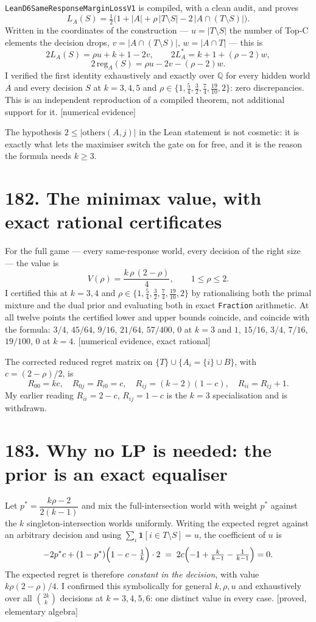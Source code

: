 \documentclass[9pt,twocolumn]{article}
\newcommand{\eclass}[1]{\textsf{[#1]}}
\renewcommand{\_}{\CIGunderscore\allowbreak}
\begin{document}
\texttt{LeanD6SameResponseMarginLossV1} is compiled, with a clean audit, and proves
\[ L_A(S)=\tfrac{1}{2}\bigl(1+|A|+\rho\,|T\setminus S|-2\,|A\cap(T\setminus S)|\bigr). \]
Written in the coordinates of the construction --- $u=|T\setminus S|$ the number of Top-C elements the decision drops, $v=|A\cap(T\setminus S)|$, $w=|A\cap T|$ --- this is
\[ 2L_A(S)=\rho u+k+1-2v,\qquad 2L^\ast_A=k+1+(\rho-2)w, \]
\[ 2\,\mathrm{reg}_A(S)=\rho u-2v-(\rho-2)w. \]
I verified the first identity exhaustively and exactly over $\mathbb{Q}$ for every hidden world $A$ and every decision $S$ at $k=3,4,5$ and $\rho\in\{1,\tfrac54,\tfrac32,\tfrac74,\tfrac{19}{10},2\}$: zero discrepancies. This is an independent reproduction of a compiled theorem, not additional support for it. \eclass{numerical evidence}

The hypothesis $2\le|\mathrm{others}(A,j)|$ in the Lean statement is not cosmetic: it is exactly what lets the maximiser switch the gate on for free, and it is the reason the formula needs $k\ge3$.

\section*{182. The minimax value, with exact rational certificates}

For the full game --- every same-response world, every decision of the right size --- the value is
\[ V(\rho)=\frac{k\,\rho\,(2-\rho)}{4},\qquad 1\le\rho\le2 . \]
I certified this at $k=3,4$ and $\rho\in\{1,\tfrac54,\tfrac32,\tfrac74,\tfrac{19}{10},2\}$ by rationalising both the primal mixture and the dual prior and evaluating both in exact \texttt{Fraction} arithmetic. At all twelve points the certified lower and upper bounds coincide, and coincide with the formula: $3/4$, $45/64$, $9/16$, $21/64$, $57/400$, $0$ at $k=3$ and $1$, $15/16$, $3/4$, $7/16$, $19/100$, $0$ at $k=4$. \eclass{numerical evidence, exact rational}

The corrected reduced regret matrix on $\{T\}\cup\{A_i=\{i\}\cup B\}$, with $c=(2-\rho)/2$, is
\[ R_{00}=kc,\quad R_{0j}=R_{i0}=c,\quad R_{ij}=(k-2)(1-c),\quad R_{ii}=R_{ij}+1 . \]
My earlier reading $R_{ii}=2-c$, $R_{ij}=1-c$ is the $k=3$ specialisation and is withdrawn.

\section*{183. Why no LP is needed: the prior is an exact equaliser}

Let $p^\ast=\dfrac{k\rho-2}{2(k-1)}$ and mix the full-intersection world with weight $p^\ast$ against the $k$ singleton-intersection worlds uniformly. Writing the expected regret against an arbitrary decision and using $\sum_i \mathbf{1}[i\in T\setminus S]=u$, the coefficient of $u$ is
\[ -2p^\ast c+(1-p^\ast)\Bigl(1-c-\tfrac1k\Bigr)\cdot 2 \;=\; 2c\Bigl(-1+\tfrac{k}{k-1}-\tfrac{1}{k-1}\Bigr)=0 . \]
The expected regret is therefore \emph{constant in the decision}, with value $k\rho(2-\rho)/4$. I confirmed this symbolically for general $k,\rho,u$ and exhaustively over all $\binom{2k}{k}$ decisions at $k=3,4,5,6$: one distinct value in every case. \eclass{proved, elementary algebra}
\end{document}
